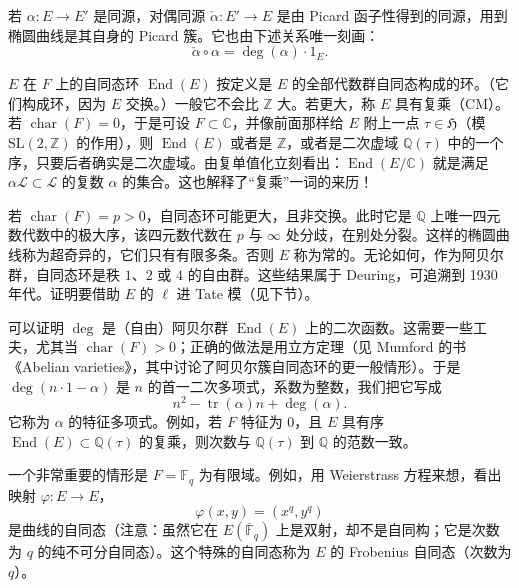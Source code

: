 若 $\alpha\colon E\to E'$ 是同源，对偶同源 $\check{\alpha}\colon E'\to E$ 是由 Picard 函子性得到的同源，用到椭圆曲线是其自身的 Picard 簇。它也由下述关系唯一刻画：
\begin{equation}\tag{1.10}\label{c5:eq:1.10}
\check{\alpha}\circ\alpha=\deg(\alpha)\cdot 1_E.
\end{equation}

$E$ 在 $F$ 上的自同态环 $\operatorname{End}(E)$ 按定义是 $E$ 的全部代数群自同态构成的环。（它们构成环，因为 $E$ 交换。）一般它不会比 $\mathbb{Z}$ 大。若更大，称 $E$ 具有复乘（CM）。若 $\operatorname{char}(F)=0$，于是可设 $F\subset\mathbb{C}$，并像前面那样给 $E$ 附上一点 $\tau\in\mathfrak{H}$（模 $\mathrm{SL}(2,\mathbb{Z})$ 的作用），则 $\operatorname{End}(E)$ 或者是 $\mathbb{Z}$，或者是二次虚域 $\mathbb{Q}(\tau)$ 中的一个序，只要后者确实是二次虚域。由复单值化立刻看出：$\operatorname{End}(E/\mathbb{C})$ 就是满足 $\alpha\mathcal{L}\subset\mathcal{L}$ 的复数 $\alpha$ 的集合。这也解释了“复乘”一词的来历！

若 $\operatorname{char}(F)=p>0$，自同态环可能更大，且非交换。此时它是 $\mathbb{Q}$ 上唯一四元数代数中的极大序，该四元数代数在 $p$ 与 $\infty$ 处分歧，在别处分裂。这样的椭圆曲线称为超奇异的，它们只有有限多条。否则 $E$ 称为常的。无论如何，作为阿贝尔群，自同态环是秩 $1$、$2$ 或 $4$ 的自由群。这些结果属于 Deuring，可追溯到 1930 年代。证明要借助 $E$ 的 $\ell$ 进 Tate 模（见下节）。

可以证明 $\deg$ 是（自由）阿贝尔群 $\operatorname{End}(E)$ 上的二次函数。这需要一些工夫，尤其当 $\operatorname{char}(F)>0$；正确的做法是用立方定理（见 Mumford 的书《Abelian varieties》，其中讨论了阿贝尔簇自同态环的更一般情形）。于是 $\deg(n\cdot1-\alpha)$ 是 $n$ 的首一二次多项式，系数为整数，我们把它写成
\begin{equation}\tag{1.11}\label{c5:eq:1.11}
n^2-\operatorname{tr}(\alpha)n+\deg(\alpha).
\end{equation}
它称为 $\alpha$ 的特征多项式。例如，若 $F$ 特征为 $0$，且 $E$ 具有序 $\operatorname{End}(E)\subset\mathbb{Q}(\tau)$ 的复乘，则次数与 $\mathbb{Q}(\tau)$ 到 $\mathbb{Q}$ 的范数一致。

一个非常重要的情形是 $F=\mathbb{F}_q$ 为有限域。例如，用 Weierstrass 方程来想，看出映射 $\varphi\colon E\to E$，
\begin{equation}\tag{1.12}\label{c5:eq:1.12}
\varphi(x,y)=(x^q,y^q)
\end{equation}
是曲线的自同态（注意：虽然它在 $E(\overline{\mathbb{F}}_q)$ 上是双射，却不是自同构；它是次数为 $q$ 的纯不可分自同态）。这个特殊的自同态称为 $E$ 的 Frobenius 自同态（次数为 $q$）。

